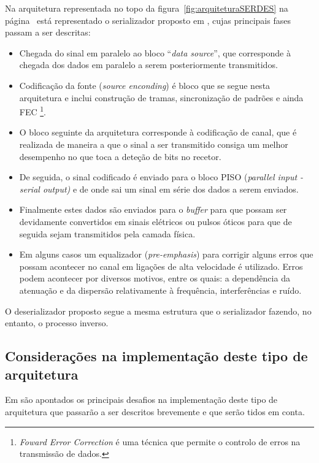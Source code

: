 Na arquitetura representada no topo da figura~\ref{fig:arquiteturaSERDES} na página~\pageref{fig:arquiteturaSERDES} está representado o serializador proposto em \cite{R012}, cujas principais fases passam a ser descritas:

\begin{itemize}
	\item Chegada do sinal em paralelo ao bloco “\textit{data source}”, que corresponde à chegada dos dados em paralelo a serem posteriormente transmitidos.
	\item Codificação da fonte (\textit{source enconding}) é bloco que se segue nesta arquitetura e inclui construção de tramas, sincronização de padrões e ainda FEC \footnote{\textit{Foward Error Correction} é uma técnica que permite o controlo de erros na transmissão de dados.}.
	\item O bloco seguinte da arquitetura corresponde à codificação de canal, que é realizada de maneira a que o sinal a ser transmitido consiga um melhor desempenho no que toca a deteção de bits no recetor.
	\item De seguida, o sinal codificado é enviado para o bloco PISO (\textit{parallel input - serial output)} e de onde sai um sinal em série dos dados a serem enviados.
	\item Finalmente estes dados são enviados para o \textit{buffer} para que possam ser devidamente convertidos em sinais elétricos ou pulsos óticos para que de seguida sejam transmitidos pela camada física. 
	\item Em alguns casos um equalizador (\textit{pre-emphasis}) para corrigir alguns erros que possam acontecer no canal em ligações de alta velocidade é utilizado. Erros podem acontecer por diversos motivos, entre os quais: a dependência da atenuação e da dispersão relativamente à frequência, interferências e ruído.
\end{itemize}

O deserializador proposto segue a mesma estrutura que o serializador fazendo, no entanto, o processo inverso.

\subsection{Considerações na implementação deste tipo de arquitetura}
Em \cite{R012} são apontados os principais desafios na implementação deste tipo de arquitetura que passarão a ser descritos brevemente e que serão tidos em conta.

